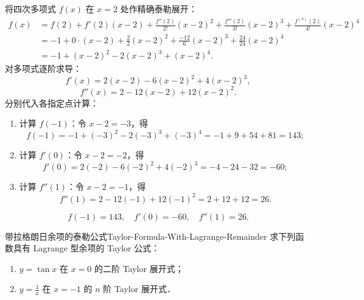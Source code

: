 \begin{solution}
    将四次多项式 $f(x)$ 在 $x = 2$ 处作精确泰勒展开：
    \begin{equation}
        \begin{aligned}
            f(x) & = f(2) + f'(2)(x-2) + \frac{f''(2)}{2!}(x-2)^2 + \frac{f'''(2)}{3!}(x-2)^3 + \frac{f^{(4)}(2)}{4!}(x-2)^4 \\
                 & = -1 + 0 \cdot (x-2) + \frac{2}{2}(x-2)^2 + \frac{-12}{6}(x-2)^3 + \frac{24}{24}(x-2)^4                   \\
                 & = -1 + (x-2)^2 - 2(x-2)^3 + (x-2)^4.
        \end{aligned}
    \end{equation}
    对多项式逐阶求导：
    \begin{equation}
        f'(x) = 2(x-2) - 6(x-2)^2 + 4(x-2)^3,
    \end{equation}
    \begin{equation}
        f''(x) = 2 - 12(x-2) + 12(x-2)^2.
    \end{equation}
    分别代入各指定点计算：
    \begin{enumerate}
        \item 计算 $f(-1)$：令 $x - 2 = -3$，得
              \begin{equation}
                  f(-1) = -1 + (-3)^2 - 2(-3)^3 + (-3)^4 = -1 + 9 + 54 + 81 = 143;
              \end{equation}
        \item 计算 $f'(0)$：令 $x - 2 = -2$，得
              \begin{equation}
                  f'(0) = 2(-2) - 6(-2)^2 + 4(-2)^3 = -4 - 24 - 32 = -60;
              \end{equation}
        \item 计算 $f''(1)$：令 $x - 2 = -1$，得
              \begin{equation}
                  f''(1) = 2 - 12(-1) + 12(-1)^2 = 2 + 12 + 12 = 26.
              \end{equation}
    \end{enumerate}
    \begin{equation}
        \boxed{f(-1) = 143, \quad f'(0) = -60, \quad f''(1) = 26.}
    \end{equation}
\end{solution}

\begin{problem}{带拉格朗日余项的泰勒公式}{Taylor-Formula-With-Lagrange-Remainder}
    求下列函数具有 Lagrange 型余项的 Taylor 公式：
    \begin{enumerate}
        \item $y = \tan x$ 在 $x = 0$ 的二阶 Taylor 展开式；
        \item $y = \frac{1}{x}$ 在 $x = -1$ 的 $n$ 阶 Taylor 展开式．
    \end{enumerate}
\end{problem}

